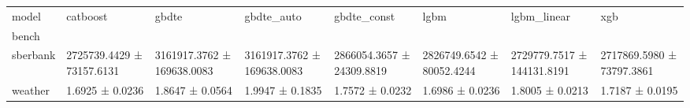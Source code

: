 \begin{tabular}{llllllll}
\toprule
model & catboost & gbdte & gbdte_auto & gbdte_const & lgbm & lgbm_linear & xgb \\
bench &  &  &  &  &  &  &  \\
\midrule
sberbank & 2725739.4429 ± 73157.6131 & 3161917.3762 ± 169638.0083 & 3161917.3762 ± 169638.0083 & 2866054.3657 ± 24309.8819 & 2826749.6542 ± 80052.4244 & 2729779.7517 ± 144131.8191 & 2717869.5980 ± 73797.3861 \\
weather & 1.6925 ± 0.0236 & 1.8647 ± 0.0564 & 1.9947 ± 0.1835 & 1.7572 ± 0.0232 & 1.6986 ± 0.0236 & 1.8005 ± 0.0213 & 1.7187 ± 0.0195 \\
\bottomrule
\end{tabular}

